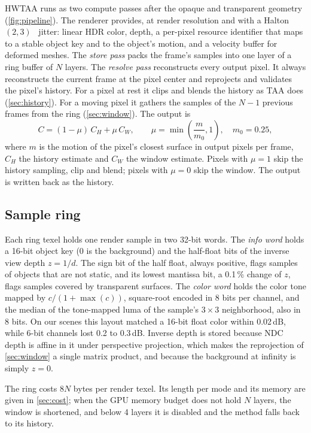 \documentclass[11pt,a4paper]{article}
\begin{document}
HWTAA runs as two compute passes after the opaque and transparent geometry (\cref{fig:pipeline}). The renderer provides, at render resolution and with a Halton$(2,3)$~\cite{halton1964} jitter: linear HDR color, depth, a per-pixel resource identifier that maps to a stable object key and to the object's motion, and a velocity buffer for deformed meshes. The \emph{store pass} packs the frame's samples into one layer of a ring buffer of $N$ layers. The \emph{resolve pass} reconstructs every output pixel. It always reconstructs the current frame at the pixel center and reprojects and validates the pixel's history. For a pixel at rest it clips and blends the history as TAA does (\cref{sec:history}). For a moving pixel it gathers the samples of the $N-1$ previous frames from the ring (\cref{sec:window}). The output is
\begin{equation}
C = (1-\mu)\, C_H + \mu\, C_W, \qquad \mu = \min\!\left(\frac{m}{m_0}, 1\right), \quad m_0 = 0.25,
\label{eq:mix}
\end{equation}
where $m$ is the motion of the pixel's closest surface in output pixels per frame, $C_H$ the history estimate and $C_W$ the window estimate. Pixels with $\mu = 1$ skip the history sampling, clip and blend; pixels with $\mu=0$ skip the window. The output is written back as the history.

\subsection{Sample ring}
\label{sec:ring}

Each ring texel holds one render sample in two 32-bit words. The \emph{info word} holds a 16-bit object key (0 is the background) and the half-float bits of the inverse view depth $z = 1/d$. The sign bit of the half float, always positive, flags samples of objects that are not static, and its lowest mantissa bit, a 0.1\,\% change of $z$, flags samples covered by transparent surfaces. The \emph{color word} holds the color tone mapped by $c/(1+\max(c))$, square-root encoded in 8 bits per channel, and the median of the tone-mapped luma of the sample's $3\times3$ neighborhood, also in 8 bits. On our scenes this layout matched a 16-bit float color within 0.02\,dB, while 6-bit channels lost 0.2 to 0.3\,dB. Inverse depth is stored because NDC depth is affine in it under perspective projection, which makes the reprojection of \cref{sec:window} a single matrix product, and because the background at infinity is simply $z=0$.

The ring costs $8N$ bytes per render texel. Its length per mode and its memory are given in \cref{sec:cost}; when the GPU memory budget does not hold $N$ layers, the window is shortened, and below 4 layers it is disabled and the method falls back to its history.
\end{document}
